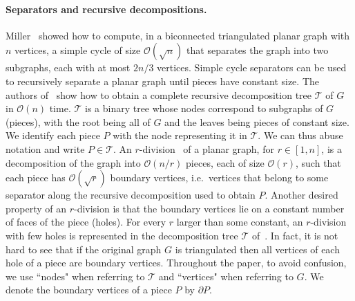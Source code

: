 \documentclass[11pt]{article}
\newcommand{\cO}{\mathcal{O}}
\newcommand{\TG}{\mathcal{T}}
\begin{document}
\paragraph{Separators and recursive decompositions.}
Miller~\cite{DBLP:conf/stoc/Miller84} showed how to compute, in a biconnected triangulated planar graph with $n$ vertices, a simple cycle of size  $\cO(\sqrt{n})$ that separates the graph into two subgraphs, each with at most $2n/3$ vertices. Simple cycle separators  can be used to recursively separate a planar graph until pieces have constant size.
The authors of~\cite{DBLP:conf/stoc/KleinMS13} show how to obtain a complete recursive decomposition tree $\TG$ of $G$ in $\cO(n)$ time. 
$\TG$ is a binary tree whose nodes correspond to subgraphs of $G$ (pieces), with the root being all of $G$ and the leaves being pieces of constant size.
We identify each piece $P$ with the node representing it in $\TG$. We can thus abuse notation and write $P\in \TG$.
An $r$-division~\cite{DBLP:journals/siamcomp/Frederickson87} of a planar graph, for $r \in [1,n]$, is a decomposition of the graph into $\cO(n/r)$ pieces, each of size $\cO(r)$, such that each piece has $\cO(\sqrt{r})$ boundary vertices, i.e.~vertices that belong to some separator along the recursive decomposition used to obtain $P$.
Another desired property of an $r$-division is that the boundary vertices lie on a constant number of faces of the piece (holes).
For every $r$ larger than some constant, an $r$-division with few holes is represented in the decomposition tree $\TG$ of~\cite{DBLP:conf/stoc/KleinMS13}. In fact, it is not hard to see that if the original graph $G$ is triangulated then all vertices of each hole of a piece are boundary vertices.
Throughout the paper, to avoid confusion, we use ``nodes" when referring to $\TG$ and ``vertices" when referring to $G$.
We denote the boundary vertices of a piece $P$ by $\partial P$. 
%
\end{document}
